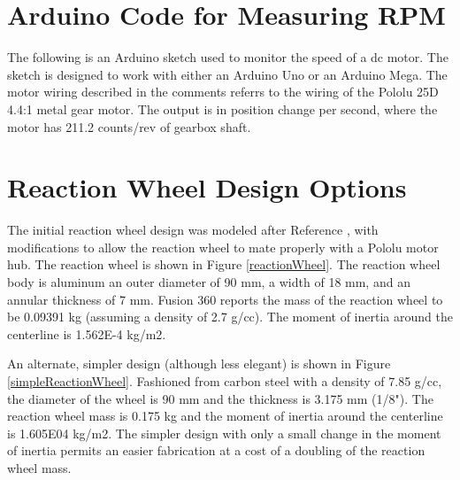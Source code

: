 \documentclass[12pt,letterpaper]{article}
\begin{document}
\begin{appendices}
\section{Arduino Code for Measuring RPM}

The following is an Arduino sketch used to monitor the speed of a dc motor.  The sketch is designed
to work with either an Arduino Uno or an Arduino Mega. The motor wiring described in the comments
referrs to the wiring of the Pololu 25D 4.4:1 metal gear motor.  The output is in position change 
per second, where the motor has 211.2 counts/rev of gearbox shaft. \\



\section{Reaction Wheel Design Options}

The initial reaction wheel design was modeled after Reference \cite{hackaday} , with modifications to allow the reaction wheel
to mate properly with a Pololu motor hub.  The reaction wheel is shown in Figure \ref{reactionWheel}.
The reaction wheel body is aluminum an outer diameter of 90 mm, a width of 18 mm, and an annular thickness of 7 mm. 
Fusion 360 reports the mass of the reaction wheel to be 0.09391 kg (assuming a density of 2.7 g/cc).
The moment of inertia around the centerline is 1.562E-4 kg/m2.

An alternate, simpler design (although less elegant) is shown in Figure \ref{simpleReactionWheel}.
Fashioned from carbon steel with a density of  7.85 g/cc, the diameter of the wheel is 90 mm and the
thickness is 3.175 mm (1/8").  The reaction wheel mass is 0.175 kg and the moment of inertia 
around the centerline is 1.605E04 kg/m2.  The simpler design with only a small change in the moment
of inertia permits an easier fabrication at a cost of a doubling of the reaction wheel mass.





\end{appendices}
\end{document}
